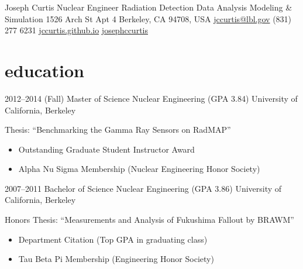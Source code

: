\documentclass[print]{resume} %
\begin{document}
\header
{Joseph }
{Curtis}
{Nuclear Engineer}
{Radiation Detection \space \faPlusSign \space\space Data Analysis \space \faPlusSign \space\space Modeling \& Simulation}
{1526 Arch St Apt 4 Berkeley, CA 94708, USA\space\space\faHome}
{\href{mailto:jccurtis@lbl.gov}{jccurtis@lbl.gov}\space\space\faEnvelopeAlt}
{(831) 277 6231\space\space\faPhone}
{\href{http://jccurtis.github.io}{jccurtis.github.io}\space\space\faGithub}
{\href{http://www.linkedin.com/in/josephccurtis}{josephccurtis}\space\space\faLinkedinSign}

\section{education}
\begin{entrylist}
	\entry
		{2012--2014 (Fall)}
		{Master of Science {\normalfont Nuclear Engineering (GPA 3.84)}}
		{University of California, Berkeley}
		{
		Thesis: ``Benchmarking the Gamma Ray Sensors on RadMAP''
		\begin{itemize}
			\item Outstanding Graduate Student Instructor Award
			\item Alpha Nu Sigma Membership (Nuclear Engineering Honor Society)
		\end{itemize}
		}
	\entry
		{2007--2011}
		{Bachelor of Science {\normalfont Nuclear Engineering (GPA 3.86)}}
		{University of California, Berkeley}
		{
		Honors Thesis: ``Measurements and Analysis of Fukushima Fallout by BRAWM'' 
		\begin{itemize}
			\item Department Citation (Top GPA in graduating class)
			\item Tau Beta Pi Membership (Engineering Honor Society)
		\end{itemize}
		}
\end{entrylist}

\end{document}
